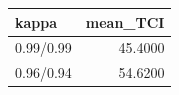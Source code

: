 \begin{tabular}{lr}
\toprule
kappa & mean\_TCI \\
\midrule
0.99/0.99 & 45.4000 \\
0.96/0.94 & 54.6200 \\
\bottomrule
\end{tabular}
